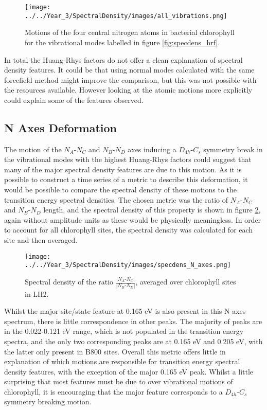\begin{figure}
    \centering
    \texttt{[image: ../../Year\_3/SpectralDensity/images/all\_vibrations.png]}
    \label{fig:hrf_vibrations}
    \caption{Motions of the four central nitrogen atoms in bacterial chlorophyll
    for the vibrational modes labelled in figure \ref{fig:specdens_hrf}.}
\end{figure}

In total the Huang-Rhys factors do not offer a clean explanation of spectral density
features. It could be that using normal modes calculated with the same forcefield
method might improve the comparison, but this was not possible with the resources
available. However looking at the atomic motions more explicitly could explain some
of the features observed.

\subsection{N Axes Deformation}
\label{subsec:N_axes_deformation}

The motion of the $N_A$-$N_C$ and $N_B$-$N_D$ axes inducing a $D_{4h}$-$C_{s}$ symmetry
break in the vibrational modes with the highest Huang-Rhys factors could suggest
that many of the major spectral density features are due to this motion. As it is
possible to construct a time series of a metric to describe this deformation, it
would be possible to compare the spectral density of these motions to the transition
energy spectral densities. The chosen metric was the ratio of $N_A$-$N_C$ and $N_B$-$N_D$
length, and the spectral density of this property is shown in figure \ref{fig:specdens_N_axes},
again without amplitude units as these would be physically meaningless. In order
to account for all chlorophyll sites, the spectral density was calculated for each
site and then averaged.

\begin{figure}
    \centering
    \texttt{[image: ../../Year\_3/SpectralDensity/images/specdens\_N\_axes.png]}
    \label{fig:specdens_N_axes}
    \caption{Spectral density of the ratio $\frac{\left\lvert N_A\text{-}N_C \right\rvert}{\left\lvert N_B\text{-}N_D \right\rvert}$,
    averaged over chlorophyll sites in LH2.}
\end{figure}

Whilst the major site/state feature at 0.165 eV is also present in this N axes spectrum,
there is little correspondence in other peaks. The majority of peaks are in the 
0.022-0.121 eV range, which is not populated in the transition energy spectra, and
the only two corresponding peaks are at 0.165 eV and 0.205 eV, with the latter only
present in B800 sites. Overall this metric offers little in explanation of which
motions are responsible for transition energy spectral density features, with the
exception of the major 0.165 eV peak. Whilst a little surprising that most features
must be due to over vibrational motions of chlorophyll, it is encouraging that the
major feature corresponds to a $D_{4h}$-$C_{s}$ symmetry breaking motion. 

